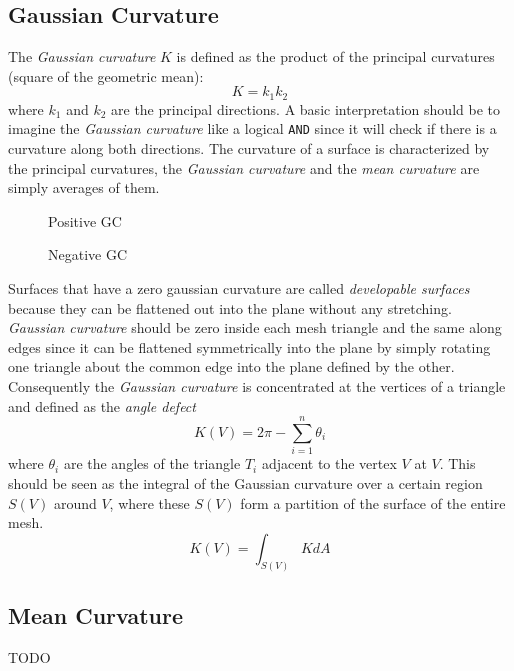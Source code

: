 \subsection{Gaussian Curvature}
The \textit{Gaussian curvature} $K$ is defined as the product of the principal curvatures (square of the geometric mean):
$$K=k_1k_2$$
where $k_1$ and $k_2$ are the principal directions. A basic interpretation should be to imagine the \textit{Gaussian curvature} like a logical \texttt{AND} since it will check if there is a curvature along both directions.
The curvature of a surface is characterized by the principal curvatures, the \textit{Gaussian curvature} and the \textit{mean curvature} are simply averages of them.
\begin{figure}[h]
  \centering
  \caption{Positive GC}\label{fig:positive-gaussian}
  \endminipage
  \centering
  \caption{Negative GC}\label{fig:negative-gaussian}
  \endminipage
\end{figure}
Surfaces that have a zero gaussian curvature are called \textit{developable surfaces} because they can be flattened out into the plane without any stretching. \textit{Gaussian curvature} should be zero inside each mesh triangle and the same along edges since it can be flattened symmetrically into the plane by simply rotating one triangle about the common edge into the plane defined by the other. Consequently the \textit{Gaussian curvature} is concentrated at the vertices of a triangle and defined as the \textit{angle defect}
$$K(V) = 2 \pi - \sum_{i=1}^n \theta_i$$
where $\theta_i$ are the angles of the triangle $T_i$ adjacent to the vertex $V$ at $V$. This should be seen as the integral of the Gaussian curvature over a certain region $S(V)$ around $V$, where these $S(V)$ form a partition of the surface of the entire mesh.
$$ K(V) = \int_{S(V)} KdA  $$



\subsection{Mean Curvature}
TODO


